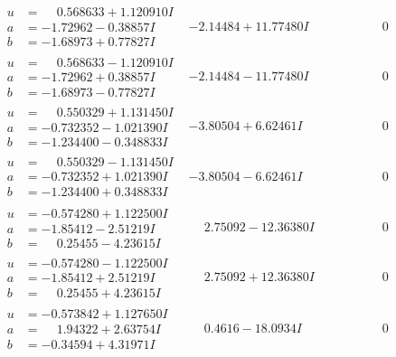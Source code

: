 \documentclass[1p]{elsarticle_modified}
\theoremstyle{definition}
\begin{document}
$$\begin{array}{c|c|c}
\begin{aligned}
u &= \phantom{-}0.568633 + 1.120910 I \\
a &= -1.72962 - 0.38857 I \\
b &= -1.68973 + 0.77827 I\end{aligned}
 & -2.14484 + 11.77480 I & \phantom{-0.000000 } 0 \\ \hline\begin{aligned}
u &= \phantom{-}0.568633 - 1.120910 I \\
a &= -1.72962 + 0.38857 I \\
b &= -1.68973 - 0.77827 I\end{aligned}
 & -2.14484 - 11.77480 I & \phantom{-0.000000 } 0 \\ \hline\begin{aligned}
u &= \phantom{-}0.550329 + 1.131450 I \\
a &= -0.732352 - 1.021390 I \\
b &= -1.234400 - 0.348833 I\end{aligned}
 & -3.80504 + 6.62461 I & \phantom{-0.000000 } 0 \\ \hline\begin{aligned}
u &= \phantom{-}0.550329 - 1.131450 I \\
a &= -0.732352 + 1.021390 I \\
b &= -1.234400 + 0.348833 I\end{aligned}
 & -3.80504 - 6.62461 I & \phantom{-0.000000 } 0 \\ \hline\begin{aligned}
u &= -0.574280 + 1.122500 I \\
a &= -1.85412 - 2.51219 I \\
b &= \phantom{-}0.25455 - 4.23615 I\end{aligned}
 & \phantom{-}2.75092 - 12.36380 I & \phantom{-0.000000 } 0 \\ \hline\begin{aligned}
u &= -0.574280 - 1.122500 I \\
a &= -1.85412 + 2.51219 I \\
b &= \phantom{-}0.25455 + 4.23615 I\end{aligned}
 & \phantom{-}2.75092 + 12.36380 I & \phantom{-0.000000 } 0 \\ \hline\begin{aligned}
u &= -0.573842 + 1.127650 I \\
a &= \phantom{-}1.94322 + 2.63754 I \\
b &= -0.34594 + 4.31971 I\end{aligned}
 & \phantom{-}0.4616 - 18.0934 I & \phantom{-0.000000 } 0 \\ \hline\begin{aligned}

\end{aligned}
\end{array}$$
\end{document}
